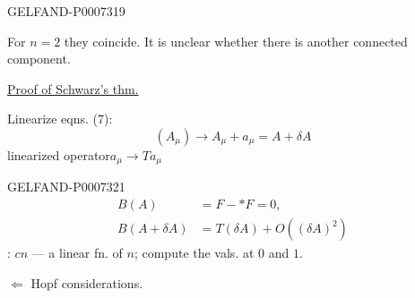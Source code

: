 \begin{GelfandAdjacentEvidence}{GELFAND-P000731}{9}


For \(n=2\) they coincide. It is unclear whether there is another connected component.

\underline{Proof of Schwarz’s thm.}

Linearize eqns. (7):
\[
(A_\mu)\longrightarrow A_\mu+a_\mu=A+\delta A
\]
linearized operator\quad \(a_\mu\longrightarrow Ta_\mu\)
\end{GelfandAdjacentEvidence}



\begin{GelfandAdjacentEvidence}{GELFAND-P000732}{1}
\[
\begin{aligned}
B(A)&=F-{*}F=0,\\
B(A+\delta A)&=T(\delta A)+O((\delta A)^2)
\end{aligned}
\]
: \(cn\) --- a linear fn. of \(n\); compute the vals. at \(0\) and \(1\).

\quad \(\Leftarrow\) Hopf considerations.
\end{GelfandAdjacentEvidence}
